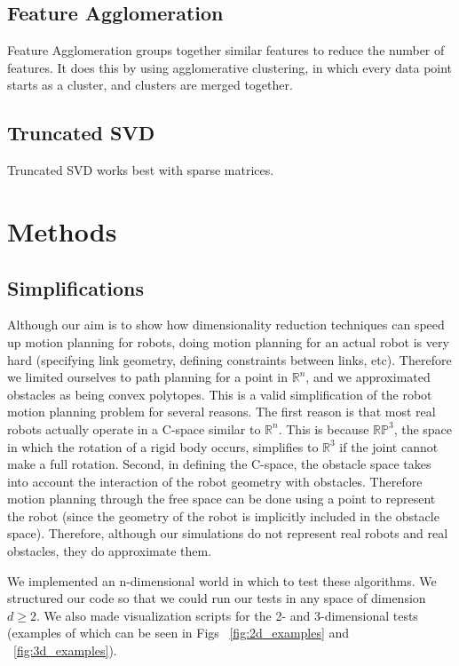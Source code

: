 \documentclass[12pt]{article}
\begin{document}
\subsection{Feature Agglomeration} Feature Agglomeration groups together similar features to reduce the number of features. It does this by using agglomerative clustering, in which every data point starts as a cluster, and clusters are merged together.

\subsection{Truncated SVD} Truncated SVD works best with sparse matrices.

\section{Methods}

\subsection{Simplifications} Although our aim is to show how dimensionality reduction techniques can speed up motion planning for robots, doing motion planning for an actual robot is very hard (specifying link geometry, defining constraints between links, etc). Therefore we limited ourselves to path planning for a point in $\mathbb{R}^n$, and we approximated obstacles as being convex polytopes. This is a valid simplification of the robot motion planning problem for several reasons. The first reason is that most real robots actually operate in a C-space similar to $\mathbb{R}^n$. This is because $\mathbb{RP}^3$, the space in which the rotation of a rigid body occurs, simplifies to $\mathbb{R}^3$ if the joint cannot make a full rotation. Second, in defining the C-space, the obstacle space takes into account the interaction of the robot geometry with obstacles. Therefore motion planning through the free space can be done using a point to represent the robot (since the geometry of the robot is implicitly included in the obstacle space). Therefore, although our simulations do not represent real robots and real obstacles, they do approximate them.

We implemented an n-dimensional world in which to test these algorithms. We structured our code so that we could run our tests in any space of dimension $d \geq 2$. We also made visualization scripts for the 2- and 3-dimensional tests (examples of which can be seen in Figs ~\ref{fig:2d_examples} and ~\ref{fig:3d_examples}).
\end{document}
